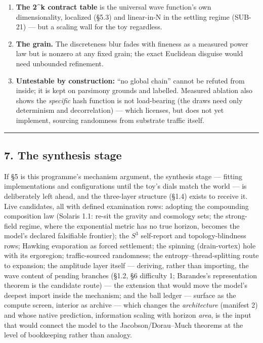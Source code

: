 \documentclass[
  11pt,
]{article}
\begin{document}
\begin{enumerate}
\item
  \textbf{The 2\^{}k contract table} is the universal wave function's
  own dimensionality, localized (\S{}5.3) and linear-in-N in the settling
  regime (SUB-21) --- but a scaling wall for the toy regardless.
\item
  \textbf{The grain.} The discreteness blur fades with fineness as a
  measured power law but is nonzero at any fixed grain; the exact
  Euclidean disguise would need unbounded refinement.
\item
  \textbf{Untestable by construction:} ``no global chain'' cannot be
  refuted from inside; it is kept on parsimony grounds and labelled.
  Measured ablation also shows the \emph{specific} hash function is not
  load-bearing (the draws need only determinism and decorrelation) ---
  which licenses, but does not yet implement, sourcing randomness from
  substrate traffic itself.
\end{enumerate}

\begin{center}\rule{0.5\linewidth}{0.5pt}\end{center}

\subsection{7. The synthesis stage}\label{the-synthesis-stage}

If \S{}5 is this programme's mechanism argument, the synthesis stage ---
fitting implementations and configurations until the toy's dials match
the world --- is deliberately left ahead, and the three-layer structure
(\S{}1.4) exists to receive it. Live candidates, all with defined
examination rows: adopting the compounding composition law (Solaris 1.1:
re-sit the gravity and cosmology sets; the strong-field regime, where
the exponential metric has no true horizon, becomes the model's declared
falsifiable frontier); the $S^3$ self-report and topology-blindness rows;
Hawking evaporation as forced settlement; the spinning (drain-vortex)
hole with its ergoregion; traffic-sourced randomness; the
entropy--thread-splitting route to expansion; the amplitude layer itself
--- deriving, rather than importing, the wave content of pending
branches (\S{}1.2, \S{}6 difficulty 1; Barandes's representation theorem is
the candidate route) --- the extension that would move the model's
deepest import inside the mechanism; and the ball ledger --- surface as
the compute screen, interior as archive --- which changes the
\emph{architecture} (manifest 2) and whose native prediction,
information scaling with horizon \emph{area}, is the input that would
connect the model to the Jacobson/Dorau--Much theorems at the level of
bookkeeping rather than analogy.
\end{document}

